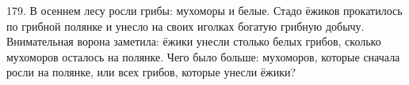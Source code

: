 179. В осеннем лесу росли грибы: мухоморы и белые. Стадо ёжиков прокатилось по грибной полянке и унесло на своих иголках богатую грибную добычу. Внимательная ворона заметила: ёжики унесли столько белых грибов, сколько мухоморов осталось на полянке. Чего было больше: мухоморов, которые сначала росли на полянке, или всех грибов, которые унесли ёжики?\\
